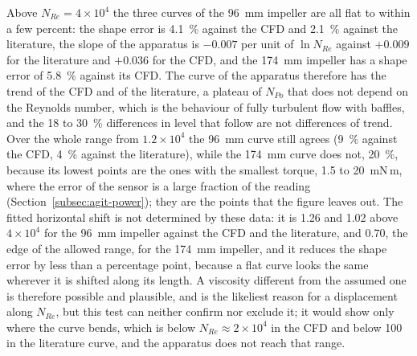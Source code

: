 \begin{table}[htbp]
    \centering
    \caption[Shape agreement of the apparatus with the CFD and the literature]{Agreement of the Power-number curve of the best run with the CFD and with the literature curve above two lower limits of $N_{Re}$. Level RMSE: RMSE of $N_{Po}$ itself. Shape RMSE: RMSE of the curves divided by their own mean (a fraction of the mean). Shifted: the same after the best horizontal shift $s$ of $N_{Re}$ within 0.7 to 1.4 ($s = \mu_{\mathrm{assumed}}/\mu_{\mathrm{true}}$). Slopes are $\mathrm dN_{Po}/\mathrm d\ln N_{Re}$ of the normalised curves.}
    \label{tab:trend}
    \small
    \resizebox{\textwidth}{!}{}
\end{table}

Above $N_{Re} = 4\times10^{4}$ the three curves of the 96~mm impeller are all flat to within a few percent: the shape error is 4.1~\% against the CFD and 2.1~\% against the literature, the slope of the apparatus is $-0.007$ per unit of $\ln N_{Re}$ against $+0.009$ for the literature and $+0.036$ for the CFD, and the 174~mm impeller has a shape error of 5.8~\% against its CFD. The curve of the apparatus therefore has the trend of the CFD and of the literature, a plateau of $N_{Po}$ that does not depend on the Reynolds number, which is the behaviour of fully turbulent flow with baffles, and the 18 to 30~\% differences in level that follow are not differences of trend. Over the whole range from $1.2\times10^{4}$ the 96~mm curve still agrees (9~\% against the CFD, 4~\% against the literature), while the 174~mm curve does not, 20~\%, because its lowest points are the ones with the smallest torque, 1.5 to 20~mN\,m, where the error of the sensor is a large fraction of the reading (Section~\ref{subsec:agit-power}); they are the points that the figure leaves out. The fitted horizontal shift is not determined by these data: it is 1.26 and 1.02 above $4\times10^{4}$ for the 96~mm impeller against the CFD and the literature, and 0.70, the edge of the allowed range, for the 174~mm impeller, and it reduces the shape error by less than a percentage point, because a flat curve looks the same wherever it is shifted along its length. A viscosity different from the assumed one is therefore possible and plausible, and is the likeliest reason for a displacement along $N_{Re}$, but this test can neither confirm nor exclude it; it would show only where the curve bends, which is below $N_{Re} \approx 2\times10^{4}$ in the CFD and below 100 in the literature curve, and the apparatus does not reach that range. %

